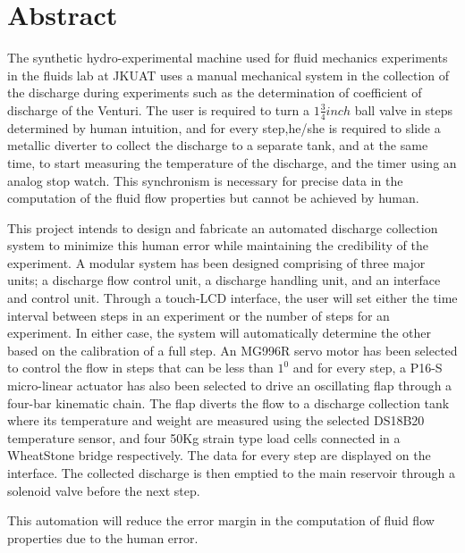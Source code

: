 \section*{Abstract}
\label{sec:}
\par
The synthetic hydro-experimental machine used for fluid mechanics experiments in the fluids lab at JKUAT uses a manual mechanical system in the collection of the discharge during experiments such as the determination of coefficient of discharge of the Venturi. The user is required to turn a $1\frac{3}{4} inch $ ball valve in steps determined by human intuition, and for every step,he/she is required to slide a metallic diverter to collect the discharge to a separate tank, and at the same time, to start measuring the temperature of the discharge, and the timer using an analog stop watch. This synchronism is necessary for precise data in the computation of the fluid flow properties but cannot be achieved by human. 
\par
This project intends to design and fabricate an automated discharge collection system to minimize this human error while maintaining the credibility of the experiment. A modular system has been designed comprising of three major units; a discharge flow control unit, a discharge handling unit, and an interface and control unit. Through a touch-LCD interface, the user will set either the time interval between steps in an experiment or the number of steps for an experiment. In either case, the system will automatically determine the other based on the calibration of a full step. An MG996R servo motor has been selected to control the flow in steps that can be less than $1^{0}$ and for every step, a P16-S micro-linear actuator has also been selected to drive an oscillating flap through a four-bar kinematic chain. The flap diverts the flow to a discharge collection tank where its temperature and weight are measured using the selected DS18B20 temperature sensor, and four 50Kg strain type load cells connected in a WheatStone bridge respectively. The data for every step are displayed on the interface. The collected discharge is then emptied to the main reservoir through a solenoid valve before the next step.

\par
This automation will reduce the error margin in the computation of fluid flow properties due to the human error.